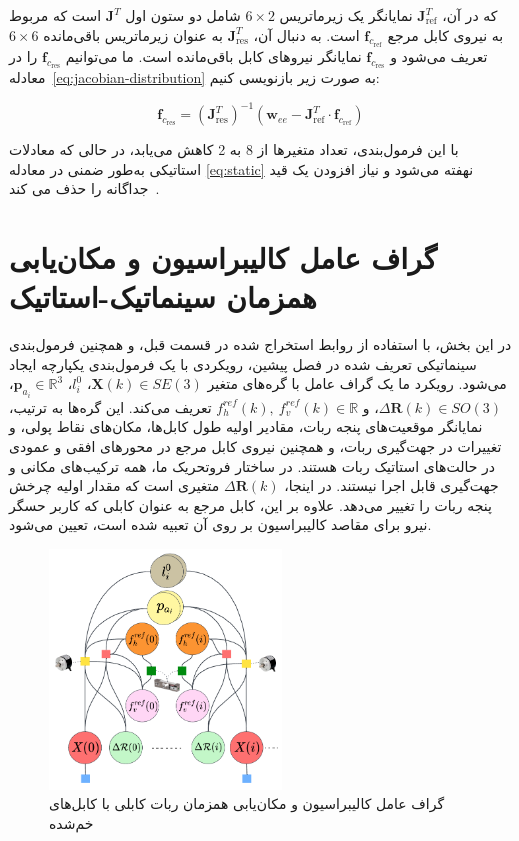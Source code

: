 که در آن، $\bm{J}^T_{\text{ref}}$ نمایانگر یک زیرماتریس $6\times2$ شامل دو ستون اول $\bm{J}^T$ است که مربوط به نیروی کابل مرجع $\mathbf{f}_{c_{\text{ref}}}$ است. به دنبال آن، $\bm{J}^T_{\text{res}}$ به عنوان زیرماتریس باقی‌مانده $6\times6$ تعریف می‌شود و $\mathbf{f}_{c_{\text{res}}}$ نمایانگر نیروهای کابل باقی‌مانده است. ما می‌توانیم $\mathbf{f}_{c_{\text{res}}}$ را در معادله~\eqref{eq:jacobian-distribution} به صورت زیر بازنویسی کنیم:

\begin{equation} \label{eq:force_base_cable_one}
	\mathbf{f}_{c_{\text{res}}} = (\bm{J}_{\text{res}}^T)^{-1} \left( \mathbf{w}_{ee} - \bm{J}_{\text{ref}}^T \cdot \mathbf{f}_{c_{\text{ref}}} \right)
\end{equation}

با این فرمول‌بندی، تعداد متغیرها از 8 به 2 کاهش می‌یابد، در حالی که معادلات استاتیکی به‌طور ضمنی در معادله \eqref{eq:static} نهفته می‌شود و نیاز افزودن یک قید جداگانه را حذف می کند~\cite{borgstrom2009nims}.




\section{گراف عامل کالیبراسیون و مکان‌یابی همزمان سینماتیک-استاتیک} \label{sec:calib_factor}

در این بخش، با استفاده از روابط استخراج شده در قسمت قبل، و همچنین فرمول‌بندی سینماتیکی تعریف شده در فصل پیشین، رویکردی با یک فرمول‌بندی یکپارچه ایجاد می‌شود. رویکرد ما یک گراف عامل با گره‌های متغیر
$\bm{X}(k) \in SE(3)$، $l^0_i$، $\bm{p}_{a_i} \in \mathbb{R}^3$، $\Delta\mathcal{\bm{R}}(k) \in SO(3)$، و $f^{ref}_{h}(k), \ f^{ref}_{v}(k) \in \mathbb{R}$
تعریف می‌کند. این گره‌ها به ترتیب، نمایانگر موقعیت‌های پنجه ربات، مقادیر اولیه طول کابل‌ها، مکان‌های نقاط پولی، و تغییرات در جهت‌گیری ربات، و همچنین نیروی کابل مرجع در محورهای افقی و عمودی در حالت‌های استاتیک ربات هستند. در ساختار فروتحریک ما، همه ترکیب‌های مکانی و جهت‌گیری قابل اجرا نیستند. در اینجا، $\Delta\mathcal{\bm{R}}(k)$ متغیری است که مقدار اولیه چرخش پنجه ربات را تغییر می‌دهد. علاوه بر این، کابل مرجع به عنوان کابلی که کاربر حسگر نیرو برای مقاصد کالیبراسیون بر روی آن تعبیه شده است، تعیین می‌شود.

\begin{figure} [t]
	\centering
	\includegraphics[width=0.55\textwidth]{img/CALIBRATION_GRAPH.pdf}
	\caption{گراف عامل کالیبراسیون و مکان‌یابی همزمان ربات کابلی با کابل‌های خم‌شده}
	\label{fig:calibration_FG}
\end{figure}

